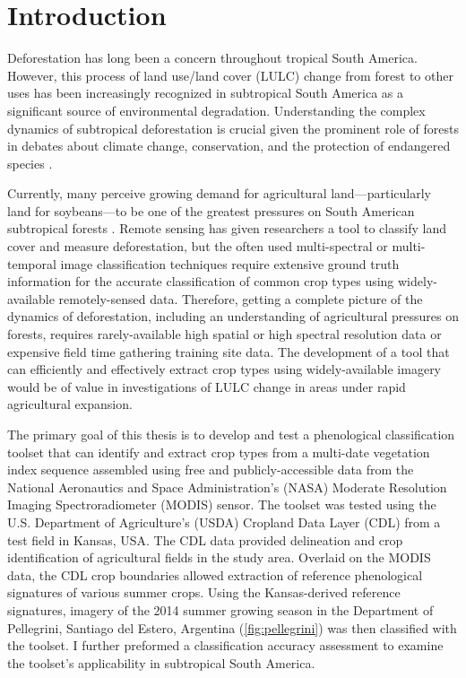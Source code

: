 \chapter{Introduction}

Deforestation has long been a concern throughout tropical South America. However, this process of land use/land cover (LULC) change from forest to other uses has been increasingly recognized in subtropical South America as a significant source of environmental degradation. Understanding the complex dynamics of subtropical deforestation is crucial given the prominent role of forests in debates about climate change, conservation, and the protection of endangered species \autocites{geist2002proximate}{zak2004do-subtropical}{bonnie2000counting}{houghton1994the-worldwide}{sala2000global}.

Currently, many perceive growing demand for agricultural land---particularly land for soybeans---to be one of the greatest pressures on South American subtropical forests \autocites{pengue2005transgenic}{grau2005agriculture}{altieri2006gm-soybean:}. Remote sensing has given researchers a tool to classify land cover and measure deforestation, but the often used multi-spectral or multi-temporal image classification techniques require extensive ground truth information for the accurate classification of common crop types using widely-available remotely-sensed data. Therefore, getting a complete picture of the dynamics of deforestation, including an understanding of agricultural pressures on forests, requires rarely-available high spatial or high spectral resolution data \autocite{senay2000using} or expensive field time gathering training site data. The development of a tool that can efficiently and effectively extract crop types using widely-available imagery would be of value in investigations of LULC change in areas under rapid agricultural expansion.

The primary goal of this thesis is to develop and test a phenological classification toolset that can identify and extract crop types from a multi-date vegetation index sequence assembled using free and publicly-accessible data from the National Aeronautics and Space Administration’s (NASA) Moderate Resolution Imaging Spectroradiometer (MODIS) sensor. The toolset was tested using the U.S. Department of Agriculture's (USDA) Cropland Data Layer (CDL) from a test field in Kansas, USA. The CDL data provided delineation and crop identification of agricultural fields in the study area. Overlaid on the MODIS data, the CDL crop boundaries allowed extraction of reference phenological signatures of various summer crops. Using the Kansas-derived reference signatures, imagery of the 2014 summer growing season in the Department of Pellegrini, Santiago del Estero, Argentina (\autoref{fig:pellegrini}) was then classified with the toolset. I further preformed a classification accuracy assessment to examine the toolset's applicability in subtropical South America.

